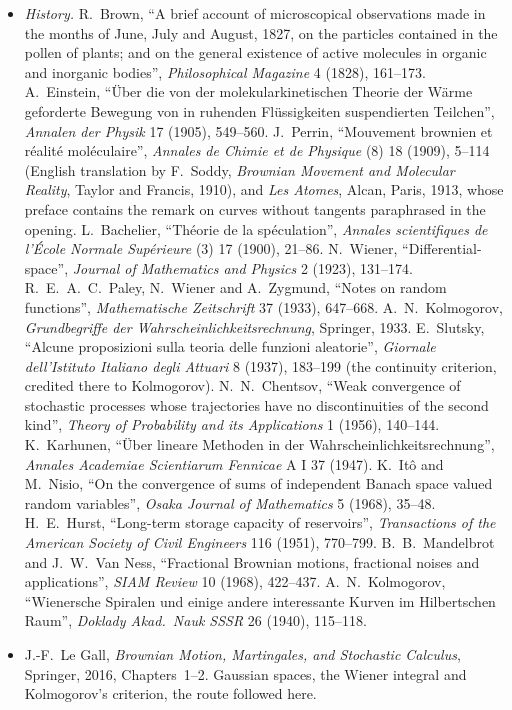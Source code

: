 \begin{itemize}
\item \emph{History.} R.~Brown, ``A brief account of microscopical observations made in the months of June, July and August, 1827, on the particles contained in the pollen of plants; and on the general existence of
active molecules in organic and inorganic bodies'', \emph{Philosophical Magazine} 4 (1828), 161--173. A.~Einstein, ``\"Uber die von der molekularkinetischen Theorie der W\"arme geforderte Bewegung von in ruhenden
Fl\"ussigkeiten suspendierten Teilchen'', \emph{Annalen der Physik} 17 (1905), 549--560. J.~Perrin, ``Mouvement brownien et r\'ealit\'e mol\'eculaire'', \emph{Annales de Chimie et de Physique} (8) 18 (1909), 5--114
(English translation by F.~Soddy, \emph{Brownian Movement and Molecular Reality}, Taylor and Francis, 1910), and \emph{Les Atomes}, Alcan, Paris, 1913, whose preface contains the remark on curves without tangents
paraphrased in the opening. L.~Bachelier, ``Th\'eorie de la sp\'eculation'', \emph{Annales scientifiques de l'\'Ecole Normale Sup\'erieure} (3) 17 (1900), 21--86. N.~Wiener, ``Differential-space'', \emph{Journal of
Mathematics and Physics} 2 (1923), 131--174. R.~E.~A.~C.~Paley, N.~Wiener and A.~Zygmund, ``Notes on random functions'', \emph{Mathematische Zeitschrift} 37 (1933), 647--668. A.~N.~Kolmogorov, \emph{Grundbegriffe der
Wahrscheinlichkeitsrechnung}, Springer, 1933. E.~Slutsky, ``Alcune proposizioni sulla teoria delle funzioni aleatorie'', \emph{Giornale dell'Istituto Italiano degli Attuari} 8 (1937), 183--199 (the continuity criterion,
credited there to Kolmogorov). N.~N.~Chentsov, ``Weak convergence of stochastic processes whose trajectories have no discontinuities of the second kind'', \emph{Theory of Probability and its Applications} 1 (1956),
140--144. K.~Karhunen, ``\"Uber lineare Methoden in der Wahrscheinlichkeitsrechnung'', \emph{Annales Academiae Scientiarum Fennicae} A I 37 (1947). K.~It\^o and M.~Nisio, ``On the convergence of sums of independent Banach
space valued random variables'', \emph{Osaka Journal of Mathematics} 5 (1968), 35--48. H.~E.~Hurst, ``Long-term storage capacity of reservoirs'', \emph{Transactions of the American Society of Civil Engineers} 116 (1951),
770--799. B.~B.~Mandelbrot and J.~W.~Van Ness, ``Fractional Brownian motions, fractional noises and applications'', \emph{SIAM Review} 10 (1968), 422--437. A.~N.~Kolmogorov, ``Wienersche Spiralen und einige andere
interessante Kurven im Hilbertschen Raum'', \emph{Doklady Akad.\ Nauk SSSR} 26 (1940), 115--118.
\item J.-F.~Le Gall, \emph{Brownian Motion, Martingales, and Stochastic Calculus}, Springer, 2016, Chapters~1--2. Gaussian spaces, the Wiener integral and Kolmogorov's criterion, the route followed here.

\end{itemize}
